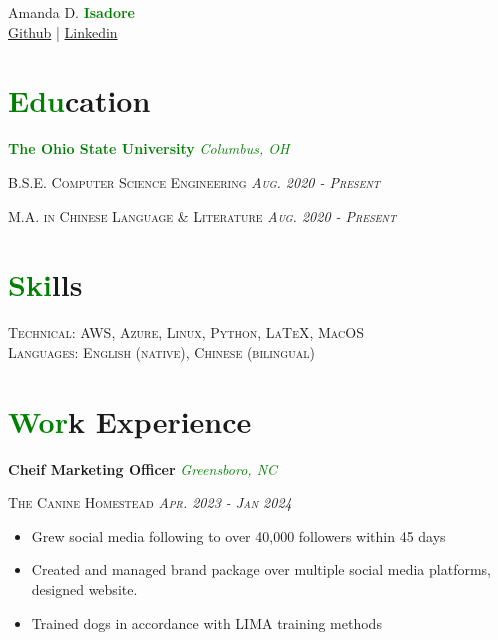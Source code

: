 \documentclass[11pt]{article}
\begin{document}
\begin{center}\Huge Amanda D. \textbf{\textcolor{green}{Isadore}}\\
\vspace{1mm}
\small \href{https://github.com/rosehaze}{Github} | \href{www.linkedin.com/in/aglingua}{Linkedin}
\end{center}

\section*{\textcolor{green}{Edu}cation}
\textbf{\textcolor{green}{The Ohio State University}} \hfill \textcolor{green}{\textit{Columbus, OH}}

\noindent \textsc{B.S.E. Computer Science Engineering \hfill {\textit{Aug. 2020 - Present}}}

\noindent \textsc{M.A. in Chinese Language \& Literature \hfill {\textit{Aug. 2020 - Present}}}

\section*{\textcolor{green}{Ski}lls}
\textsc{Technical: AWS, Azure, Linux, Python, \LaTeX, MacOS\\
Languages: English (native), Chinese (bilingual)}

\section*{\textcolor{green}{Wor}k Experience}

\noindent \textbf{Cheif Marketing Officer} \hfill \textcolor{green}{\textit{Greensboro, NC}}

\noindent \textsc{The Canine Homestead \hfill {\textit{Apr. 2023 - Jan 2024}}}
\vspace{-2mm}
\begin{itemize}
    \setlength{\itemsep}{0cm}
    \setlength{\parskip}{0cm}
    \addtolength{\leftskip}{-5mm}
    \item Grew social media following to over 40,000 followers within 45 days
    \item Created and managed brand package over multiple social media platforms, designed website.
    \item Trained dogs in accordance with LIMA training methods
\end{itemize}
\end{document}

